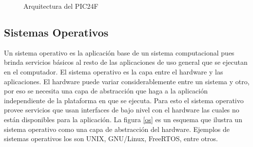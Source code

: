 \documentclass[11pt,letterpaper]{article}
\begin{document}
\begin{figure}[ht!]
\centering
{}
\caption{Arquitectura del PIC24F}\label{pic_perif}
\end{figure}


\subsection{Sistemas Operativos}
Un sistema operativo es la aplicación base de un sistema computacional pues brinda servicios básicos al resto de las aplicaciones de uso general que se ejecutan en el computador. El sistema operativo es la capa entre el hardware y las aplicaciones. El hardware puede variar considerablemente entre un sistema y otro, por eso se necesita una capa de abstracción que haga a la aplicación independiente de la plataforma en que se ejecuta. Para esto el sistema operativo provee servicios que usan interfaces de bajo nivel con el hardware las cuales no están disponibles para la aplicación. La figura \ref{os} es un esquema que ilustra un sistema operativo como una capa de abstracción del hardware. Ejemplos de sistemas operativos los son UNIX, GNU/Linux, FreeRTOS, entre otros.
\end{document}

